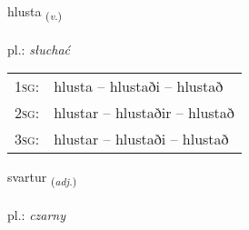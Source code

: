 \documentclass[frontgrid, backgrid]{flacards}\usepackage[]{graphicx}\usepackage[]{xcolor}
\begin{document}
\renewcommand{\flhead}{\vskip5pt \fboxsep=0pt {\small\bfseries\footnotesize Sagnorð | Verb}}
\renewcommand{\fcfoot}{\vskip5pt \fboxsep=0pt \hspace{2pt}{\small\bfseries\footnotesize 1K}}

\renewcommand{\blhead}{\vskip5pt {\small\bfseries\footnotesize Sagnorð | Verb }}
\renewcommand{\bcfoot}{\vskip5pt \hspace{2pt}{\small\bfseries\footnotesize 1K}}


{hlusta \small{\textsubscript{(\textit{v.})}} \\[1ex] %
\textphonetic{[l̥ʏsta]} \\
pl.: \emph{słuchać} \\  [2ex]
\renewcommand*{\arraystretch}{0.8}
\begin{tabular}{p{1cm}l}
\textsc{1sg}: & hlusta -- hlustaði -- hlustað \\ 
\textsc{2sg}: & hlustar -- hlustaðir -- hlustað \\ 
\textsc{3sg}: & hlustar -- hlustaði -- hlustað \\ 
\end{tabular}
}

\renewcommand{\flhead}{\vskip5pt \fboxsep=0pt {\small\bfseries\footnotesize Lýsingarorð | Adjective}}
\renewcommand{\fcfoot}{\vskip5pt \fboxsep=0pt \hspace{2pt}{\small\bfseries\footnotesize 1K}}

\renewcommand{\blhead}{\vskip5pt {\small\bfseries\footnotesize Lýsingarorð | Adjective }}
\renewcommand{\bcfoot}{\vskip5pt \hspace{2pt}{\small\bfseries\footnotesize 1K}}


{svartur \small{\textsubscript{(\textit{adj.})}} \\[1ex] %
 \\
pl.: \emph{czarny} \\  [2ex]
\renewcommand*{\arraystretch}{0.8}
}
\end{document}
